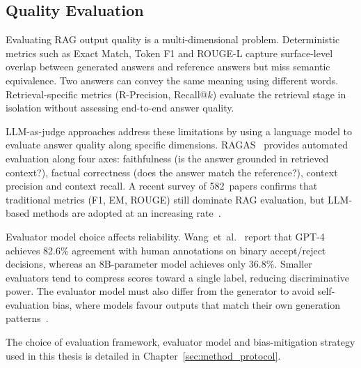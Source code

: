 \subsection{Quality Evaluation}
\label{subsec:quality-eval}

Evaluating RAG output quality is a multi-dimensional problem. Deterministic metrics 
such as Exact Match, Token F1 and ROUGE-L capture surface-level overlap between 
generated answers and reference answers but miss semantic equivalence. Two answers 
can convey the same meaning using different words. Retrieval-specific metrics 
(R-Precision, Recall@$k$) evaluate the retrieval stage in isolation without assessing 
end-to-end answer quality.

LLM-as-judge approaches address these limitations by using a language model to
evaluate answer quality along specific dimensions. RAGAS~\cite{ragas2023} provides
automated evaluation along four axes: faithfulness (is the answer grounded in retrieved
context?), factual correctness (does the answer match the reference?), context precision
and context recall. A recent survey of 582~papers confirms that traditional metrics
(F1, EM, ROUGE) still dominate RAG evaluation, but LLM-based methods are adopted at an
increasing rate~\cite{ragevalsurvey2025}.

Evaluator model choice affects reliability. Wang~et~al.~\cite{vrageval2024}
report that GPT-4 achieves 82.6\% agreement with human annotations on
binary accept/reject decisions, whereas an 8B-parameter model achieves
only 36.8\%. Smaller evaluators tend to compress scores toward a
single label, reducing discriminative power. The evaluator model must
also differ from the generator to avoid self-evaluation bias, where
models favour outputs that match their own generation
patterns~\cite{vrageval2024}.

The choice of evaluation framework, evaluator model and bias-mitigation
strategy used in this thesis is detailed in Chapter~\ref{sec:method_protocol}.